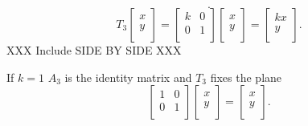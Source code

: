 \documentclass{report}
\begin{document}
{\begin{enumerate}[label=(\roman*)]
\[			.\] 
			\[
			T_3 \begin{bmatrix}
			x\\
			y\\
			\end{bmatrix}
			= \begin{bmatrix}
			k & 0\\
			0 & 1\\
			\end{bmatrix} \begin{bmatrix}
			x\\
			y\\
			\end{bmatrix}
			= \begin{bmatrix}
			kx\\
			y\\
			\end{bmatrix}
			.\] 
            XXX Include SIDE BY SIDE XXX
		
			If $ k=1$ $ A_3$ is the identity matrix and $ T_3$ fixes the plane 
			\[
			\begin{bmatrix}
			1 & 0\\
			0 & 1\\
			\end{bmatrix} \begin{bmatrix}
			x\\
			y\\
			\end{bmatrix}
			= \begin{bmatrix}
			x\\
			y\\
			\end{bmatrix}
			
			.\] 
                \end{enumerate}
       }
\end{document}
